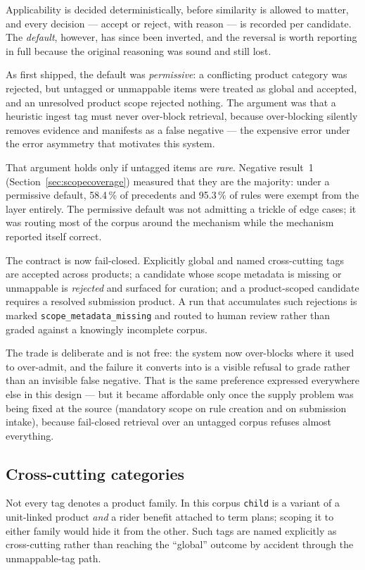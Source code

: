 \documentclass[10pt]{article}
\newcommand{\code}[1]{\texttt{\small #1}}
\begin{document}
Applicability is decided deterministically, before similarity is allowed to
matter, and every decision --- accept or reject, with reason --- is recorded per
candidate. The \emph{default}, however, has since been inverted, and the
reversal is worth reporting in full because the original reasoning was sound and
still lost.

As first shipped, the default was \emph{permissive}: a conflicting product
category was rejected, but untagged or unmappable items were treated as global
and accepted, and an unresolved product scope rejected nothing. The argument was
that a heuristic ingest tag must never over-block retrieval, because
over-blocking silently removes evidence and manifests as a false negative --- the
expensive error under the error asymmetry that motivates this system.

That argument holds only if untagged items are \emph{rare}. Negative result~1
(Section~\ref{sec:scopecoverage}) measured that they are the majority: under a
permissive default, 58.4\,\% of precedents and 95.3\,\% of rules were exempt from
the layer entirely. The permissive default was not admitting a trickle of
edge cases; it was routing most of the corpus around the mechanism while the
mechanism reported itself correct.

The contract is now fail-closed. Explicitly global and named cross-cutting tags
are accepted across products; a candidate whose scope metadata is missing or
unmappable is \emph{rejected} and surfaced for curation; and a product-scoped
candidate requires a resolved submission product. A run that accumulates such
rejections is marked \code{scope\_metadata\_missing} and routed to human review
rather than graded against a knowingly incomplete corpus.

The trade is deliberate and is not free: the system now over-blocks where it
used to over-admit, and the failure it converts into is a visible refusal to
grade rather than an invisible false negative. That is the same preference
expressed everywhere else in this design --- but it became affordable only once
the supply problem was being fixed at the source (mandatory scope on rule
creation and on submission intake), because fail-closed retrieval over an
untagged corpus refuses almost everything.

\subsection{Cross-cutting categories}

Not every tag denotes a product family. In this corpus \code{child} is a
variant of a unit-linked product \emph{and} a rider benefit attached to term
plans; scoping it to either family would hide it from the other. Such tags are
named explicitly as cross-cutting rather than reaching the ``global'' outcome by
accident through the unmappable-tag path.
\end{document}
